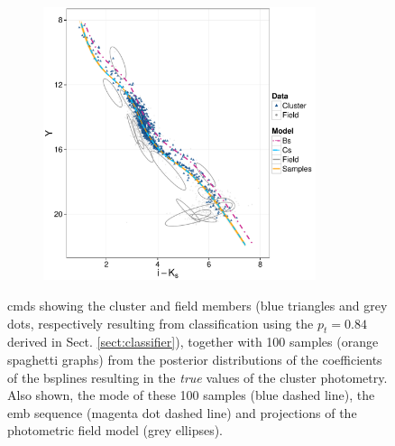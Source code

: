 \begin{figure}[ht!]
\begin{subfigure}[t]{0.48\textwidth}
        \caption{}   
    \end{subfigure}
     \begin{subfigure}[t]{0.48\textwidth}
      \includegraphics[page=4,height=8cm,width=\textwidth]{background/Figures/BHM/CMDs.pdf}
        \caption{}
    \end{subfigure}
\caption{\glspl{cmd} showing the cluster and field members (blue triangles and grey dots, respectively resulting from classification using the $p_t = 0.84$ derived in Sect. \ref{sect:classifier}), together with 100 samples (orange spaghetti graphs) from the posterior distributions of the coefficients of the \glspl{bspline} resulting in the \emph{true} values of the cluster photometry. Also shown, the mode of these 100 samples (blue dashed line), the \gls{emb} sequence (magenta dot dashed line) and projections of the photometric field model (grey ellipses).}
\label{fig:CMDs_results}
\end{figure}

